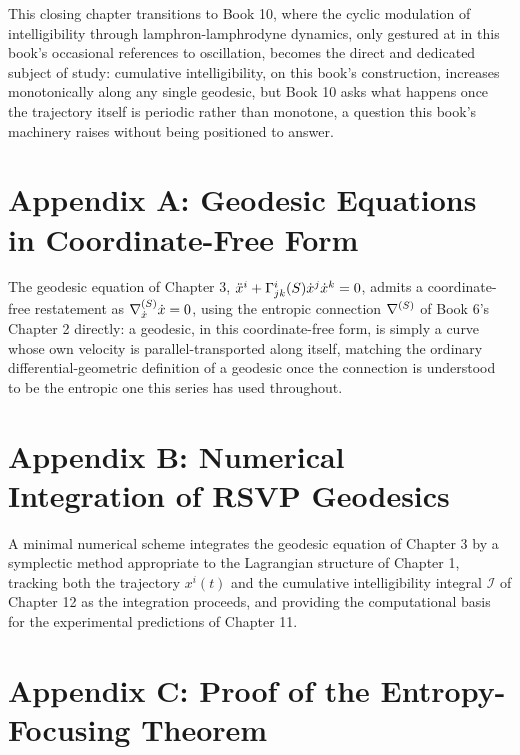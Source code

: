 This closing chapter transitions to Book 10, where the cyclic modulation of intelligibility through lamphron-lamphrodyne dynamics, only gestured at in this book's occasional references to oscillation, becomes the direct and dedicated subject of study: cumulative intelligibility, on this book's construction, increases monotonically along any single geodesic, but Book 10 asks what happens once the trajectory itself is periodic rather than monotone, a question this book's machinery raises without being positioned to answer.

\chapter*{Appendix A: Geodesic Equations in Coordinate-Free Form}

The geodesic equation of Chapter 3, $\ddot{x}^i + \Gamma^i_{jk}(S)\dot{x}^j\dot{x}^k = 0$, admits a coordinate-free restatement as $\nabla^{(S)}_{\dot{x}} \dot{x} = 0$, using the entropic connection $\nabla^{(S)}$ of Book 6's Chapter 2 directly: a geodesic, in this coordinate-free form, is simply a curve whose own velocity is parallel-transported along itself, matching the ordinary differential-geometric definition of a geodesic once the connection is understood to be the entropic one this series has used throughout.

\chapter*{Appendix B: Numerical Integration of RSVP Geodesics}

A minimal numerical scheme integrates the geodesic equation of Chapter 3 by a symplectic method appropriate to the Lagrangian structure of Chapter 1, tracking both the trajectory $x^i(t)$ and the cumulative intelligibility integral $\mathcal{I}$ of Chapter 12 as the integration proceeds, and providing the computational basis for the experimental predictions of Chapter 11.

\chapter*{Appendix C: Proof of the Entropy-Focusing Theorem}

